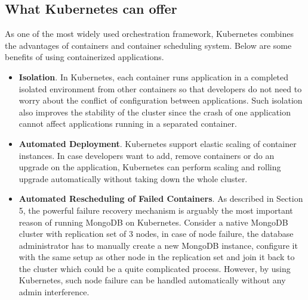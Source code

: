 \documentclass[sigconf]{acmart}
\begin{document}
\subsection{What Kubernetes can offer}
As one of the most widely used orchestration framework, Kubernetes combines the advantages of containers and container scheduling system. Below are some benefits of using containerized applications.
\begin{itemize}
    \item \textbf{Isolation}. In Kubernetes, each container runs application in a completed isolated environment from other containers so that developers do not need to worry about the conflict of configuration between applications. Such isolation also improves the stability of the cluster since the crash of one application cannot affect applications running in a separated container.
    \item \textbf{Automated Deployment}. Kubernetes support elastic scaling of container instances. In case developers want to add, remove containers or do an upgrade on the application, Kubernetes can perform scaling and rolling upgrade automatically without taking down the whole cluster.
    \item \textbf{Automated Rescheduling of Failed Containers}. As described in Section 5, the powerful failure recovery mechanism is arguably the most important reason of running MongoDB on Kubernetes. Consider a native MongoDB cluster with replication set of 3 nodes, in case of node failure, the database administrator has to manually create a new MongoDB instance, configure it with the same setup as other node in the replication set and join it back to the cluster which could be a quite complicated process. However, by using Kubernetes, such node failure can be handled automatically without any admin interference.
\end{itemize}
\end{document}
